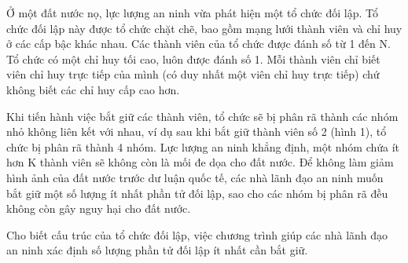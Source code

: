 Ở một đất nước nọ, lực lượng an ninh vừa phát hiện một tổ chức đối lập. Tổ chức đối lập này được tổ chức chặt chẽ, bao gồm mạng lưới thành viên và chỉ huy ở các cấp bậc khác nhau. Các thành viên của tổ chức được đánh số từ 1 đến N. Tổ chức có một chỉ huy tối cao, luôn được đánh số 1. Mỗi thành viên chỉ biết viên chỉ huy trực tiếp của mình (có duy nhất một viên chỉ huy trực tiếp) chứ không biết các chỉ huy cấp cao hơn.

Khi tiến hành việc bắt giữ các thành viên, tổ chức sẽ bị phân rã thành các nhóm nhỏ không liên kết với nhau, ví dụ sau khi bắt giữ thành viên số 2 (hình 1), tổ chức bị phân rã thành 4 nhóm. Lực lượng an ninh khẳng định, một nhóm chứa ít hơn K thành viên sẽ không còn là mối đe dọa cho đất nước. Để không làm giảm hình ảnh của đất nước trước dư luận quốc tế, các nhà lãnh đạo an ninh muốn bắt giữ một số lượng ít nhất phần tử đối lập, sao cho các nhóm bị phân rã đều không còn gây nguy hại cho đất nước.

Cho biết cấu trúc của tổ chức đối lập, việc chương trình giúp các nhà lãnh đạo an ninh xác định số lượng phần tử đối lập ít nhất cần bắt giữ.

\